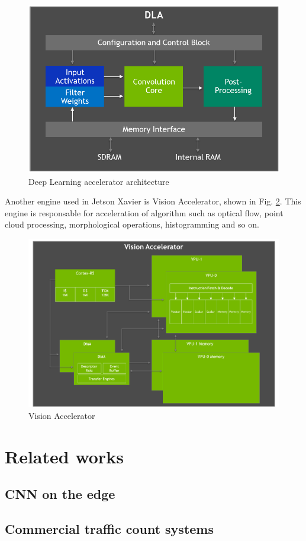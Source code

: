 \documentclass[twoside]{ctuthesis}
\theoremstyle{plain}
\theoremstyle{definition}
\theoremstyle{note}
\begin{document}
\begin{figure}[h]
\caption{Deep Learning accelerator architecture\cite{nvidia_blog_xavier}}
\label{fig:dla}
\includegraphics[width=.7\textwidth]{images/introduction/DLA.png}
\end{figure}


Another engine used in Jetson Xavier is Vision Accelerator, shown in Fig. \ref{fig:va}. This engine is responsable for acceleration of algorithm such as optical flow, point cloud processing, morphological operations, histogramming and so on.  

\begin{figure}[h]
\caption{Vision Accelerator\cite{nvidia_blog_xavier}}
\label{fig:va}
\includegraphics[width=.7\textwidth]{images/introduction/va.png}
\end{figure}
\chapter{Related works}

\section{CNN on the edge}

\section{Commercial traffic count systems}
\end{document}
